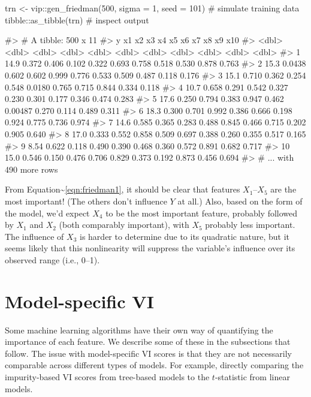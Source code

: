 \begin{Schunk}
\begin{Sinput}
trn <- vip::gen_friedman(500, sigma = 1, seed = 101)  # simulate training data
tibble::as_tibble(trn)  # inspect output
\end{Sinput}
\begin{Soutput}
#> # A tibble: 500 x 11
#>        y     x1    x2    x3    x4     x5      x6    x7    x8    x9   x10
#>    <dbl>  <dbl> <dbl> <dbl> <dbl>  <dbl>   <dbl> <dbl> <dbl> <dbl> <dbl>
#>  1 14.9  0.372  0.406 0.102 0.322 0.693  0.758   0.518 0.530 0.878 0.763
#>  2 15.3  0.0438 0.602 0.602 0.999 0.776  0.533   0.509 0.487 0.118 0.176
#>  3 15.1  0.710  0.362 0.254 0.548 0.0180 0.765   0.715 0.844 0.334 0.118
#>  4 10.7  0.658  0.291 0.542 0.327 0.230  0.301   0.177 0.346 0.474 0.283
#>  5 17.6  0.250  0.794 0.383 0.947 0.462  0.00487 0.270 0.114 0.489 0.311
#>  6 18.3  0.300  0.701 0.992 0.386 0.666  0.198   0.924 0.775 0.736 0.974
#>  7 14.6  0.585  0.365 0.283 0.488 0.845  0.466   0.715 0.202 0.905 0.640
#>  8 17.0  0.333  0.552 0.858 0.509 0.697  0.388   0.260 0.355 0.517 0.165
#>  9  8.54 0.622  0.118 0.490 0.390 0.468  0.360   0.572 0.891 0.682 0.717
#> 10 15.0  0.546  0.150 0.476 0.706 0.829  0.373   0.192 0.873 0.456 0.694
#> # ... with 490 more rows
\end{Soutput}
\end{Schunk}

From Equation\textasciitilde{}\eqref{eqn:friedman1}, it should be clear
that features \(X_1\)--\(X_5\) are the most important! (The others don't
influence \(Y\) at all.) Also, based on the form of the model, we'd
expect \(X_4\) to be the most important feature, probably followed by
\(X_1\) and \(X_2\) (both comparably important), with \(X_5\) probably
less important. The influence of \(X_3\) is harder to determine due to
its quadratic nature, but it seems likely that this nonlinearity will
suppress the variable's influence over its observed range (i.e., 0--1).

\section{Model-specific VI}

Some machine learning algorithms have their own way of quantifying the
importance of each feature. We describe some of these in the subsections
that follow. The issue with model-specific VI scores is that they are
not necessarily comparable across different types of models. For
example, directly comparing the impurity-based VI scores from tree-based
models to the \(t\)-statistic from linear models.

